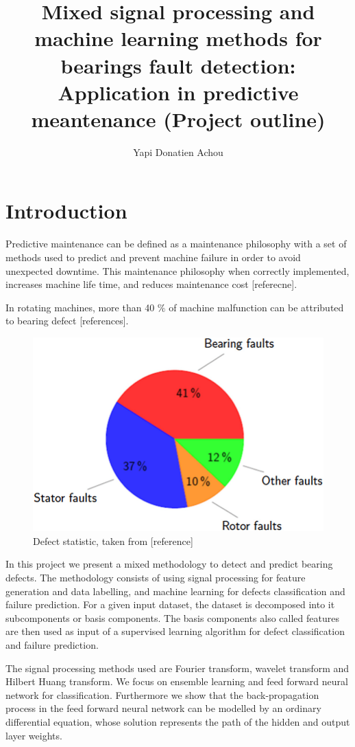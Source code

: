 \documentclass[11pt, oneside]{article}   	%
\title{Mixed signal processing and machine learning methods for bearings fault detection: Application in predictive meantenance (Project outline)}
\author{Yapi Donatien Achou}
\begin{document}
\maketitle
\section{Introduction}
Predictive maintenance can be defined as a maintenance philosophy with a set of methods used to predict and prevent machine failure in order to avoid unexpected downtime. This maintenance philosophy when correctly implemented, increases machine life time, and reduces maintenance cost [referecne].
\begin{flushleft}
In rotating machines, more than 40 $\%$ of machine malfunction can be attributed to bearing defect [references]. 
\end{flushleft}
\begin{figure}[H] %
   \centering
   \includegraphics[width=5in]{pie.png} 
   \caption{Defect statistic, taken from [reference]}
   \label{fig:pie}
\end{figure}
In this project we present a mixed methodology to detect and predict bearing defects. The methodology consists of using signal processing for feature generation and data labelling,  and machine learning for defects classification and failure prediction. For a given input dataset, the dataset is decomposed into it subcomponents or basis components. The basis components also called features are then used as input of a supervised learning algorithm for defect classification and failure prediction.
\begin{flushleft}
The signal processing methods used are Fourier transform, wavelet transform and Hilbert Huang transform. We focus on ensemble learning and feed forward neural network for classification. Furthermore we show that the back-propagation process in the feed forward neural network can be modelled by an ordinary differential equation, whose solution represents the path of the hidden and output layer weights.
\end{flushleft}
\end{document}
